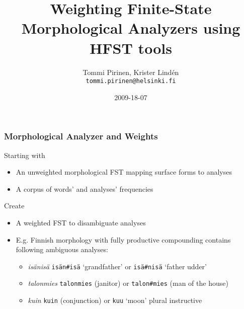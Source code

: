 \documentclass[utf8]{beamer}
\begin{document}
\title{Weighting Finite-State Morphological Analyzers
  using \textsc{HFST} tools}

\author[Tommi Pirinen]{Tommi Pirinen, Krister Lindén\\
\texttt{tommi.pirinen@helsinki.fi}}
\date{2009-18-07}

\begin{frame}
\titlepage
\end{frame}

\begin{frame}
\frametitle{Morphological Analyzer and Weights}
Starting with
\begin{itemize}
\item An unweighted morphological FST mapping surface forms to analyses
\item A corpus of words' and analyses' frequencies
\end{itemize}
Create
\begin{itemize}
\item A weighted FST to disambiguate analyses
\item E.g. Finnish morphology with fully productive compounding contains 
      following ambiguous analyses:
\begin{itemize}
  \item \emph{isänisä} \texttt{isän\#isä} `grandfather' or
        \texttt{isä\#nisä} `father udder'
  \item \emph{talonmies} \texttt{talonmies} (janitor) or
        \texttt{talon\#mies} (man of the house)
  \item \emph{kuin} \texttt{kuin} (conjunction) or
        \texttt{kuu} `moon' plural instructive
\end{itemize}
\end{itemize}
\end{frame}
\end{document}
